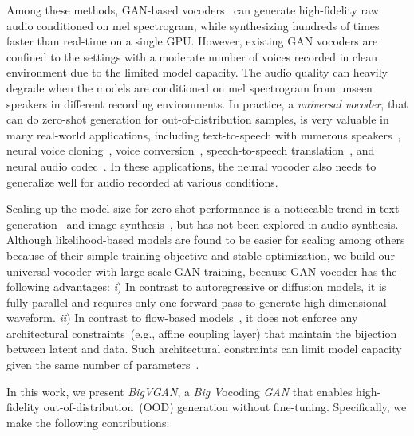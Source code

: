 \documentclass{article} \usepackage{iclr2023_conference,times}
\theoremstyle{plain}
\theoremstyle{definition}
\theoremstyle{remark}
\begin{document}
Among these methods, GAN-based vocoders~\citep[e.g.,][]{kong2020hifi} can generate high-fidelity raw audio conditioned on mel spectrogram, while synthesizing hundreds of times faster than real-time on a single GPU. 
However, existing GAN vocoders are confined to the settings with a moderate number of voices recorded in clean environment due to the limited model capacity. The audio quality can heavily degrade when the models are conditioned on mel spectrogram from unseen speakers in different recording environments. 
In practice, a \emph{universal vocoder}, that can do zero-shot generation for out-of-distribution samples, is very valuable in many real-world applications, including text-to-speech with numerous speakers~\citep{ping2017deep}, neural voice cloning~\citep{arik2018neural, jia2018transfer}, voice conversion~\citep{liu2018wavenet}, speech-to-speech translation~\citep{jia2019direct}, and neural audio codec~\citep{zeghidour2021soundstream}. In these applications, the neural vocoder also needs to generalize well for audio recorded at various conditions.


Scaling up the model size for zero-shot performance is a noticeable trend in text generation~\citep[e.g.,][]{brown2020language} and image synthesis~\citep[e.g.,][]{ramesh2021zero}, but has not been explored in audio synthesis.
Although likelihood-based models are found to be easier for scaling among others because of their simple training objective and stable optimization, we build our universal vocoder with large-scale GAN training, because GAN vocoder has the following advantages:
\emph{i}) In contrast to autoregressive or diffusion models, it is fully parallel and requires only one forward pass to generate high-dimensional waveform.
\emph{ii}) In contrast to flow-based models~\citep{prenger2019waveglow}, it does not enforce any architectural constraints~(e.g., affine coupling layer) that maintain the bijection between latent and data. 
Such architectural constraints can limit model capacity given the same number of parameters~\citep{ping2019waveflow}.



In this work, we present \emph{BigVGAN}, a \emph{Big}  \emph{V}ocoding \emph{GAN} that enables high-fidelity out-of-distribution~(OOD) generation without fine-tuning. 
Specifically, we make the following contributions:
\end{document}
